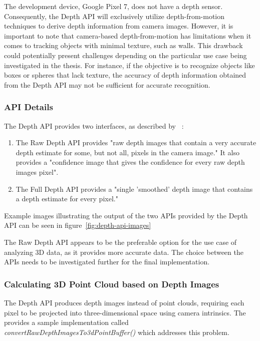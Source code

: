 The development device, Google Pixel 7, does not have a depth sensor.
Consequently, the Depth API will exclusively utilize depth-from-motion techniques to derive depth information from camera images.
However, it is important to note that camera-based depth-from-motion has limitations when it comes to tracking objects with minimal texture, such as walls.
This drawback could potentially present challenges depending on the particular use case being investigated in the thesis.
For instance, if the objective is to recognize objects like boxes or spheres that lack texture, the accuracy of depth information obtained from the Depth API may not be sufficient for accurate recognition.

\subsubsection{API Details}
The Depth API provides two interfaces, as described by ~\parencite{arcore-doc-raw-depth}:
\begin{enumerate}
    \item The Raw Depth API provides "raw depth images that contain a very accurate depth estimate for some, but not all, pixels in the camera image."
    It also provides a "confidence image that gives the confidence for every raw depth images pixel".
    \item The Full Depth API provides a "single 'smoothed' depth image that contains a depth estimate for every pixel."
\end{enumerate}

Example images illustrating the output of the two APIs provided by the Depth API can be seen in figure~\ref{fig:depth-api-images}

The Raw Depth API appears to be the preferable option for the use case of analyzing 3D data, as it provides more accurate data.
The choice between the APIs needs to be investigated further for the final implementation.

\subsubsection{Calculating 3D Point Cloud based on Depth Images}
The Depth API produces depth images instead of point clouds, requiring each pixel to be projected into three-dimensional space using camera intrinsics.
The~~\parencite{arcore-codelab-rawdepth} provides a sample implementation called \textit{convertRawDepthImagesTo3dPointBuffer()} which addresses this problem.



